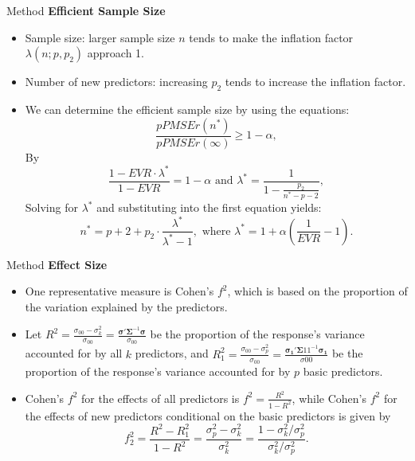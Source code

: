 \documentclass{beamer}
\begin{document}
\begin{frame}{Method}
\textbf{Efficient Sample Size}
\begin{itemize}
\item Sample size: larger sample size $n$ tends to make the inflation factor $\lambda(n;p,p_2)$ approach 1.
\item Number of new predictors: increasing $p_2$ tends to increase the inflation factor.
\item We can determine the efficient sample size by using the equations:
$$
\frac{pPMSEr(n^*)}{pPMSEr(\infty)} \geq 1-\alpha, 
$$
By 
$$
\frac{1 - EVR\cdot \lambda^*}{1 - EVR} = 1- \alpha 
\text{ and } 
\lambda^*=\frac{1}{1 - \frac{p_2}{n^*-p-2}},
$$
Solving for $\lambda^*$ and substituting into the first equation yields:\begin{equation}
\label{eq:effi.n}
n^* = p+2 + p_2 \cdot \frac{\lambda^*}{\lambda^*-1}, \text{ where } 
\lambda^*= 1+ \alpha(\frac{1}{EVR} - 1 ). 
\end{equation}
\end{itemize}
\end{frame}


\begin{frame}{Method}
\textbf{Effect Size}
\begin{itemize}
\item One representative measure is Cohen's $f^2$, which is based on the proportion of the variation explained by the predictors.
\item Let $R^2 = \frac{\sigma_{00}-\sigma^2_k}{\sigma_{00}} = \frac{\boldsymbol{\sigma}' \boldsymbol{\Sigma}^{-1} \boldsymbol{\sigma}}{\sigma_{00}}$ be the proportion of the response's variance accounted for by all $k$ predictors, and $R_1^2 = \frac{\sigma_{00}-\sigma^2_p}{\sigma_{00}} = \frac{\boldsymbol{\sigma_1}' \boldsymbol{\Sigma}{11}^{-1} \boldsymbol{\sigma_1}}{\sigma{00}}$ be the proportion of the response's variance accounted for by $p$ basic predictors.
\item Cohen's $f^2$ for the effects of all predictors is $f^2 = \frac{R^2}{1-R^2}$, while Cohen's $f^2$ for the effects of new predictors conditional on the basic predictors is given by
\begin{equation}
\label{eq:f2}
f_2^2 = \frac{R^2 - R_1^2}{1- R^2} = \frac{\sigma_p^2 - \sigma_k^2}{\sigma_k^2} = \frac{1 - \sigma_k^2/\sigma_p^2}{\sigma_k^2/\sigma_p^2}.
\end{equation}
\end{itemize}
\end{frame}
\end{document}
